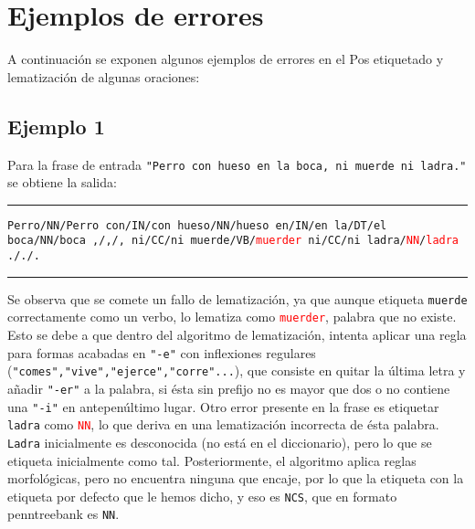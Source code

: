 \section{Ejemplos de errores}
A continuación se exponen algunos ejemplos de errores en el Pos etiquetado y lematización de \newline algunas oraciones: 
\subsection*{Ejemplo 1}
Para la frase de entrada \texttt{"Perro con hueso en la boca, ni muerde ni ladra."} se obtiene la salida: \newline

\noindent\rule{14cm}{0.4pt}\newline
\texttt{Perro/NN/Perro\newline
con/IN/con\newline
hueso/NN/hueso\newline
en/IN/en\newline
la/DT/el\newline
boca/NN/boca\newline
,/,/,\newline
ni/CC/ni\newline
muerde/VB/\textcolor{red}{muerder}\newline
ni/CC/ni\newline
ladra/\textcolor{red}{NN}/\textcolor{red}{ladra}\newline
././.\newline
}
\noindent\rule{14cm}{0.4pt}\newline

Se observa que se comete un fallo de lematización, ya que aunque etiqueta \texttt{muerde} correctamente como un verbo, lo lematiza como \texttt{\textcolor{red}{muerder}}, palabra que no existe. Esto se debe a que dentro del algoritmo de lematización, intenta aplicar una regla para formas acabadas en \texttt{"-e"} con inflexiones \newline regulares (\texttt{"comes","vive","ejerce","corre"...}), que consiste en quitar la última letra y añadir \texttt{"-er"} a la palabra, si ésta sin prefijo no es mayor que dos o no contiene una \texttt{"-i"} en antepenúltimo lugar. Otro error presente en la frase es etiquetar \texttt{ladra} como \texttt{\textcolor{red}{NN}}, lo que deriva en una lematización incorrecta de ésta palabra. \texttt{Ladra} inicialmente es desconocida (no está en el diccionario), pero lo que se etiqueta inicialmente como tal. Posteriormente, el algoritmo aplica reglas morfológicas, pero no encuentra ninguna que encaje, por lo que la etiqueta con la etiqueta por defecto que le hemos dicho, y eso es \texttt{NCS}, que en formato penntreebank es \texttt{NN}.
